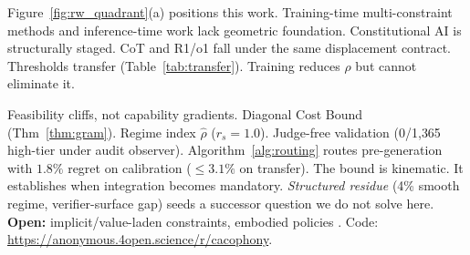 \documentclass{article}
\theoremstyle{plain}
\theoremstyle{definition}
\theoremstyle{remark}
\newcommand{\rhohat}{\hat{\rho}}
\begin{document}


Figure~\ref{fig:rw_quadrant}(a) positions this work. Training-time multi-constraint methods \citep{yu2020gradient,liu2021cagrad,navon2022nashmtl,he2025pama,sener2018multi} and inference-time work \citep{madaan2023selfrefine,meyerson2025maker,lior2025wildifeval,qi2025agentif} lack geometric foundation. Constitutional AI \citep{bai2022constitutional} is structurally staged. CoT and R1/o1 fall under the same displacement contract. Thresholds transfer (Table~\ref{tab:transfer}). Training reduces $\rho$ but cannot eliminate it.

Feasibility cliffs, not capability gradients. Diagonal Cost Bound (Thm~\ref{thm:gram}). Regime index $\rhohat$ ($r_s{=}1.0$). Judge-free validation (0/1{,}365 high-tier under audit observer). Algorithm~\ref{alg:routing} routes pre-generation with $1.8\%$ regret on calibration ($\le 3.1\%$ on transfer). The bound is kinematic. It establishes when integration becomes mandatory. \emph{Structured residue} (4\% smooth regime, verifier-surface gap) seeds a successor question we do not solve here. \textbf{Open:} implicit/value-laden constraints, embodied policies \citep{nvidia2025cosmos}. Code: \url{https://anonymous.4open.science/r/cacophony}.

\begin{ack}
\end{ack}


{\raggedright


}


\appendix

\renewcommand{\thetable}{A\arabic{table}}
\setcounter{table}{0}
\renewcommand{\thefigure}{A\arabic{figure}}
\setcounter{figure}{0}
\renewcommand{\theequation}{A\arabic{equation}}
\setcounter{equation}{0}
\makeatletter
\renewcommand{\theHtable}{appendix.\thesection.\arabic{table}}
\renewcommand{\theHfigure}{appendix.\thesection.\arabic{figure}}
\renewcommand{\theHequation}{appendix.\thesection.\arabic{equation}}
\makeatother
\end{document}
